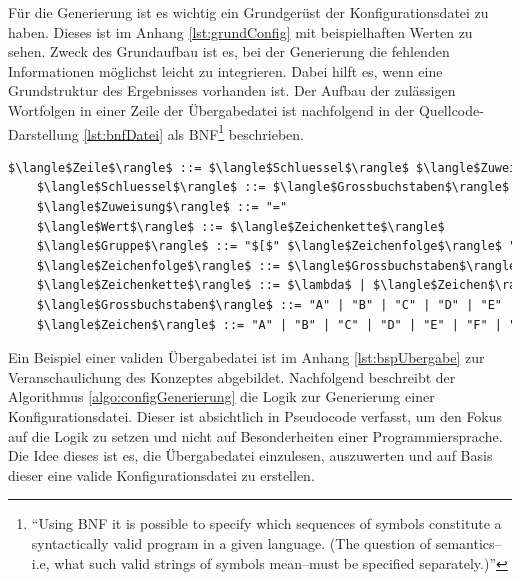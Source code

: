 Für die Generierung ist es wichtig ein Grundgerüst der Konfigurationsdatei zu haben. Dieses ist im Anhang \vref{lst:grundConfig} mit beispielhaften Werten zu sehen. Zweck des Grundaufbau ist es, bei der Generierung die fehlenden Informationen möglichst leicht zu integrieren. Dabei hilft es, wenn eine Grundstruktur des Ergebnisses vorhanden ist. Der Aufbau der zulässigen Wortfolgen in einer Zeile der Übergabedatei ist nachfolgend in der Quellcode-Darstellung \vref{lst:bnfDatei} als \ac{BNF}\footnote{\enquote{Using BNF it is possible to specify which sequences of symbols constitute a syntactically valid program in a given language. (The question of semantics--i.e, what such valid strings of symbols mean--must be specified separately.)}\autocite[][]{mccracken_backus-naur_2003}} beschrieben.

\begin{lstlisting}[language=html, caption={\ac{BNF} der Übergabedatei}, label=lst:bnfDatei, mathescape=true]
	$\langle$Zeile$\rangle$ ::= $\langle$Schluessel$\rangle$ $\langle$Zuweisung$\rangle$  $\langle$Wert$\rangle$ $\langle$EOL$\rangle$ | $\langle$Gruppe$\rangle$ $\langle$EOL$\rangle$ | $\lambda$ $\langle$EOL$\rangle$
	$\langle$Schluessel$\rangle$ ::= $\langle$Grossbuchstaben$\rangle$ | $\langle$Grossbuchstaben$\rangle$ $\langle$Schluessel$\rangle$
	$\langle$Zuweisung$\rangle$ ::= "="
	$\langle$Wert$\rangle$ ::= $\langle$Zeichenkette$\rangle$
	$\langle$Gruppe$\rangle$ ::= "$[$" $\langle$Zeichenfolge$\rangle$ "$]$"
	$\langle$Zeichenfolge$\rangle$ ::= $\langle$Grossbuchstaben$\rangle$ | $\langle$Grossbuchstaben$\rangle$ $\langle$Zeichenfolge$\rangle$
	$\langle$Zeichenkette$\rangle$ ::= $\lambda$ | $\langle$Zeichen$\rangle$ | $\langle$Zeichen$\rangle$ $\langle$Zeichenkette$\rangle$
	$\langle$Grossbuchstaben$\rangle$ ::= "A" | "B" | "C" | "D" | "E" | "F" | "G" | "H" | "I" | "J" | "K" | "L" | "M" | "N" | "O" | "P" | "Q" | "R" | "S" | "T" | "U" | "V" | "W" | "X" | "Y" | "Z" | 
	$\langle$Zeichen$\rangle$ ::= "A" | "B" | "C" | "D" | "E" | "F" | "G" | "H" | "I" | "J" | "K" | "L" | "M" | "N" | "O" | "P" | "Q" | "R" | "S" | "T" | "U" | "V" | "W" | "X" | "Y" | "Z" | "_" | "/" | "-" | ":" | "." | "a" | "b" | "c" | "d" | "e" | "f" | "g" | "h" | "i" | "j" | "k" | "l" | "m" | "n" | "o" | "p" | "q" | "r" | "s" | "t" | "u" | "v" | "w" | "x" | "y" | "z"
\end{lstlisting}
Ein Beispiel einer validen Übergabedatei ist im Anhang \ref{lst:bspUbergabe} zur Veranschaulichung des Konzeptes abgebildet. Nachfolgend beschreibt der Algorithmus \ref{algo:configGenerierung} die Logik zur Generierung einer Konfigurationsdatei. Dieser ist absichtlich in Pseudocode verfasst, um den Fokus auf die Logik zu setzen und nicht auf Besonderheiten einer Programmiersprache. Die Idee dieses ist es, die Übergabedatei einzulesen, auszuwerten und auf Basis dieser eine valide Konfigurationsdatei zu erstellen.

